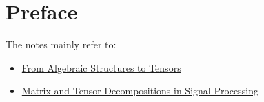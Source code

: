 \chapter*{Preface}

The notes mainly refer to:
\begin{itemize}
    \item \href{}{From Algebraic Structures to Tensors}
    \item \href{}{Matrix and Tensor Decompositions in Signal Processing}
\end{itemize}

